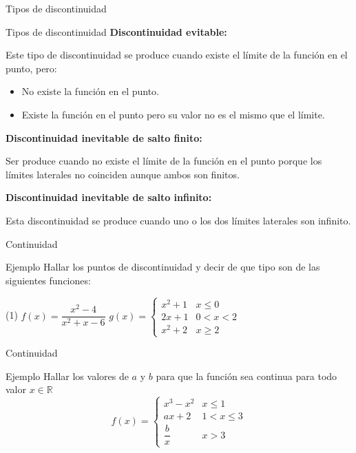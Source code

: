 \documentclass[8pt]{beamer}
\newcommand{\R}{\mathbb{R}}
\begin{document}
\begin{frame}[t]{Tipos de  discontinuidad}
\begin{alertblock}{Tipos de discontinuidad}
\pause
\textbf{Discontinuidad evitable:}

\pause
Este tipo de discontinuidad se produce cuando existe el límite de la función en el punto, pero:
\begin{itemize}[<+-| alert@+>]
\item No existe la función en el punto.
\item Existe la función en el punto pero su valor no es el mismo que el límite.
\end{itemize}

\pause
\textbf{Discontinuidad inevitable de salto finito:}

\pause
Ser produce cuando no existe el límite de la función en el punto porque los límites laterales no coinciden aunque ambos son finitos.

\pause
\textbf{Discontinuidad inevitable de salto infinito:}

\pause
Esta discontinuidad se produce cuando uno o los dos límites laterales son infinito.
\end{alertblock}
\end{frame}

\begin{frame}[t]{Continuidad}
\begin{exampleblock}{Ejemplo}
Hallar los puntos de discontinuidad y decir de que tipo son de las siguientes funciones:
\begin{tasks}[label=\alph*)](1)
\task $f(x)=\dfrac{x^2-4}{x^2+x-6}$
\task $g(x)=\begin{cases} x^2+1 & x \leq 0 \\ 2x+1 & 0< x < 2 \\ x^2+2 & x \geq 2 \end{cases}$
\end{tasks}
\end{exampleblock}
\end{frame}

\begin{frame}[t]{Continuidad}
\begin{exampleblock}{Ejemplo}
Hallar los valores de $a$ y $b$ para que la función sea continua para todo valor $x \in \R$
\[ f(x)= \begin{cases} x^3-x^2 & x \leq 1 \\ ax+2 &  1< x \leq 3 \\  \dfrac{b}{x} & x > 3 \end{cases} \]
\end{exampleblock}


\end{frame}
\end{document}
